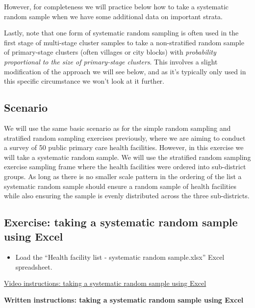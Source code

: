 \documentclass[
]{book}
\providecommand{\tightlist}{%
  \setlength{\itemsep}{0pt}\setlength{\parskip}{0pt}}
\begin{document}
However, for completeness we will practice below how to take a systematic random sample when we have some additional data on important strata.

Lastly, note that one form of systematic random sampling is often used in the first stage of multi-stage cluster samples to take a non-stratified random sample of primary-stage clusters (often villages or city blocks) with \emph{probability proportional to the size of primary-stage clusters}. This involves a slight modification of the approach we will see below, and as it's typically only used in this specific circumstance we won't look at it further.

\hypertarget{scenario-2}{%
\subsection{Scenario}\label{scenario-2}}

We will use the same basic scenario as for the simple random sampling and stratified random sampling exercises previously, where we are aiming to conduct a survey of 50 public primary care health facilities. However, in this exercise we will take a systematic random sample. We will use the stratified random sampling exercise sampling frame where the health facilities were ordered into sub-district groups. As long as there is no smaller scale pattern in the ordering of the list a systematic random sample should ensure a random sample of health facilities while also ensuring the sample is evenly distributed across the three sub-districts.

\hypertarget{exercise-taking-a-systematic-random-sample-using-excel}{%
\subsection{Exercise: taking a systematic random sample using Excel}\label{exercise-taking-a-systematic-random-sample-using-excel}}

\begin{itemize}
\tightlist
\item
  Load the ``Health facility list - systematic random sample.xlsx'' Excel spreadsheet.
\end{itemize}

\href{https://youtu.be/S-aZjcmt6PY}{Video instructions: taking a systematic random sample using Excel}

\textbf{Written instructions: taking a systematic random sample using Excel}
\end{document}

